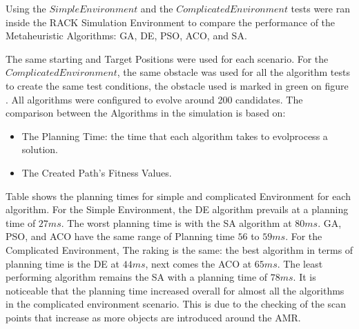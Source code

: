 Using the \(Simple Environment\) and the \(Complicated Environment\) tests were ran inside the 
RACK Simulation Environment to compare the performance of the Metaheuristic Algorithms: GA, DE, PSO,
ACO, and SA. 

The same starting and Target Positions were used for each scenario. For the \(Complicated Environment\),
the same obstacle was used for all the algorithm tests to create the same test conditions, the obstacle used is 
marked in green on figure . All algorithms were configured to evolve around 200 candidates.
The comparison between the Algorithms in the simulation is based on: 
\begin{itemize}
    \item The Planning Time: the time that each algorithm takes to evolprocess a solution.
    \item The Created Path's Fitness Values.
\end{itemize}

Table  shows the planning times for simple and complicated Environment 
for each algorithm. 
For the Simple Environment, the DE algorithm prevails at a planning time of \(27ms\).
The worst planning time is with the SA algorithm at \(80ms\). 
GA, PSO, and ACO have the same range of Planning time \(56\) to \(59ms\).
For the Complicated Environment, The raking is the same: the best algorithm in terms of planning time 
is the DE at \(44ms\), next comes the ACO at \(65ms\). The least performing algorithm remains the SA 
with a planning time of \(78ms\). It is noticeable that the planning time increased overall
for almost all the algorithms in the complicated environment scenario. 
This is due to the checking of the scan points that increase as more objects are introduced around the AMR.


